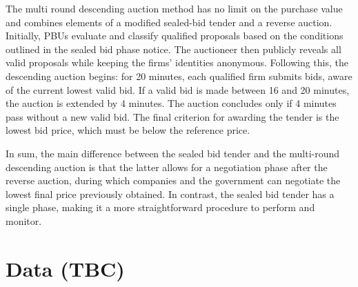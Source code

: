 \documentclass[12 pt]{elsarticle}
\begin{document}
The multi round descending auction method has no limit on the purchase value and combines elements of a modified sealed-bid tender and a reverse auction. Initially, PBUs evaluate and classify qualified proposals based on the conditions outlined in the sealed bid phase notice. The auctioneer then publicly reveals all valid proposals while keeping the firms' identities anonymous. Following this, the descending auction begins: for 20 minutes, each qualified firm submits bids, aware of the current lowest valid bid. If a valid bid is made between 16 and 20 minutes, the auction is extended by 4 minutes. The auction concludes only if 4 minutes pass without a new valid bid. The final criterion for awarding the tender is the lowest bid price, which must be below the reference price.




In sum, the main difference between the sealed bid tender and the multi-round descending auction is that the latter allows for a negotiation phase after the reverse auction, during which companies and the government can negotiate the lowest final price previously obtained. In contrast, the sealed bid tender has a single phase, making it a more straightforward procedure to perform and monitor.





\section{Data (TBC)}\label{data}
\end{document}
